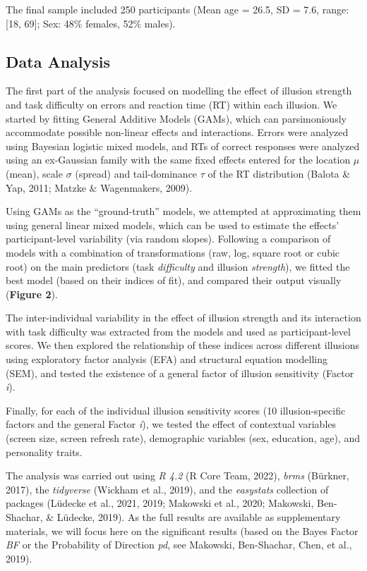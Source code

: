 \documentclass[
  man,floatsintext]{apa6}
\begin{document}
The final sample included 250 participants (Mean age = 26.5, SD = 7.6, range: {[}18, 69{]}; Sex: 48\% females, 52\% males).

\hypertarget{data-analysis}{%
\subsection{Data Analysis}\label{data-analysis}}

The first part of the analysis focused on modelling the effect of illusion strength and task difficulty on errors and reaction time (RT) within each illusion. We started by fitting General Additive Models (GAMs), which can parsimoniously accommodate possible non-linear effects and interactions. Errors were analyzed using Bayesian logistic mixed models, and RTs of correct responses were analyzed using an ex-Gaussian family with the same fixed effects entered for the location \(\mu\) (mean), scale \(\sigma\) (spread) and tail-dominance \(\tau\) of the RT distribution (Balota \& Yap, 2011; Matzke \& Wagenmakers, 2009).

Using GAMs as the ``ground-truth'' models, we attempted at approximating them using general linear mixed models, which can be used to estimate the effects' participant-level variability (via random slopes). Following a comparison of models with a combination of transformations (raw, log, square root or cubic root) on the main predictors (task \emph{difficulty} and illusion \emph{strength}), we fitted the best model (based on their indices of fit), and compared their output visually (\textbf{Figure 2}).

The inter-individual variability in the effect of illusion strength and its interaction with task difficulty was extracted from the models and used as participant-level scores. We then explored the relationship of these indices across different illusions using exploratory factor analysis (EFA) and structural equation modelling (SEM), and tested the existence of a general factor of illusion sensitivity (Factor \emph{i}).

Finally, for each of the individual illusion sensitivity scores (10 illusion-specific factors and the general Factor \emph{i}), we tested the effect of contextual variables (screen size, screen refresh rate), demographic variables (sex, education, age), and personality traits.

The analysis was carried out using \emph{R 4.2} (R Core Team, 2022), \emph{brms} (Bürkner, 2017), the \emph{tidyverse} (Wickham et al., 2019), and the \emph{easystats} collection of packages (Lüdecke et al., 2021, 2019; Makowski et al., 2020; Makowski, Ben-Shachar, \& Lüdecke, 2019). As the full results are available as supplementary materials, we will focus here on the significant results (based on the Bayes Factor \emph{BF} or the Probability of Direction \emph{pd}, see Makowski, Ben-Shachar, Chen, et al., 2019).
\end{document}
